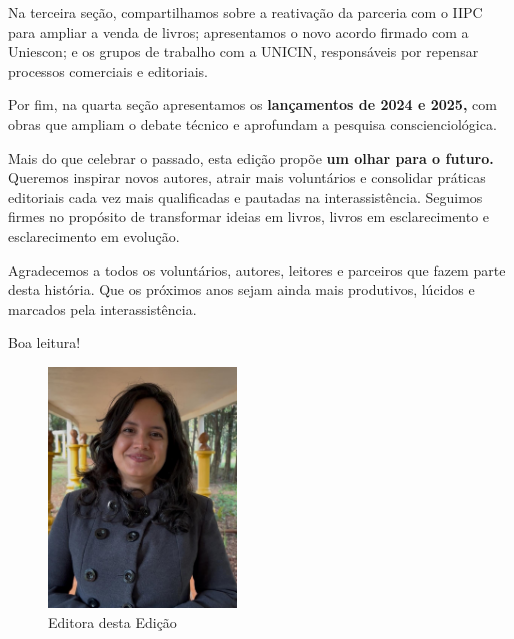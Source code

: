 \documentclass{gescons}
\begin{document}
\begin{multicols}{2}
Na terceira seção, compartilhamos sobre a reativação da parceria com o IIPC para ampliar a venda de livros; apresentamos o novo acordo firmado com a Uniescon; e os grupos de trabalho com a UNICIN, responsáveis por repensar processos comerciais e editoriais.

Por fim, na quarta seção apresentamos os \textbf{lançamentos de 2024 e 2025,} com obras que ampliam o debate técnico e aprofundam a pesquisa conscienciológica.

Mais do que celebrar o passado, esta edição propõe \textbf{um olhar para o futuro.} Queremos inspirar novos autores, atrair mais voluntários e consolidar práticas editoriais cada vez mais qualificadas e pautadas na interassistência. Seguimos firmes no propósito de transformar ideias em livros, livros em esclarecimento e esclarecimento em evolução.

Agradecemos a todos os voluntários, autores, leitores e parceiros que fazem parte desta história. Que os próximos anos sejam ainda mais produtivos, lúcidos e marcados pela interassistência.

Boa leitura!




        
    \end{multicols}

\begin{figure}[h] %
\centering %
\includegraphics[width=5cm,trim={0 200 0 70},clip]{articles/editorial/imagens/Amanda.jpeg}
\caption*{Editora desta Edição} %
\end{figure}
\end{document}
